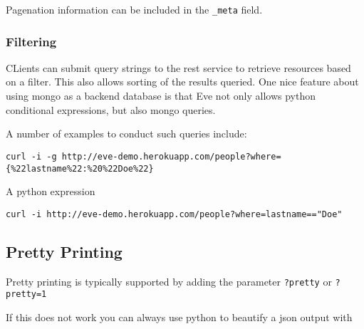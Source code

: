 Pagenation information can be included in the \verb|_meta| field.


\subsubsection{Filtering}


CLients can submit query strings to the rest service to retrieve
resources based on a filter. This also allows sorting of the results
queried. One nice feature about using mongo as a backend database is
that Eve not only allows python conditional expressions, but also
mongo queries.

A number of examples to conduct such queries include:


\begin{lstlisting}
curl -i -g http://eve-demo.herokuapp.com/people?where={%22lastname%22:%20%22Doe%22}
\end{lstlisting}

A python expression

\begin{lstlisting}
curl -i http://eve-demo.herokuapp.com/people?where=lastname=="Doe"
\end{lstlisting}

\begin{comment}
\subsection{Rendering Data in UI}

\TODO{seems incomplete}

In this section, we are talking about the way of using HATEOAS
practically in user interface development in web applications.

\begin{lstlisting}
  <resource>
  <link rel='child' href='student' title='student'/>
  </resource>
\end{lstlisting}

This is the practical representation of the HATEOAS in real world
applications.
\end{comment}

\subsection{Pretty Printing}

Pretty printing is typically supported by adding the parameter
\verb|?pretty| or \verb|?pretty=1|

If this does not work you can always use python to beautify a json
output with 

